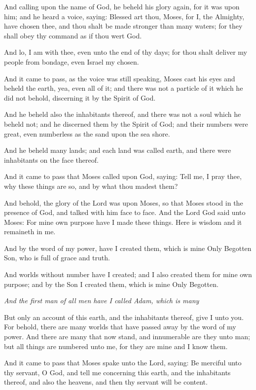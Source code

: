 And calling upon the name of God, he beheld his glory again, for it was upon him; and he
heard a voice, saying: Blessed art thou, Moses, for I, the Almighty, have chosen thee, and
thou shalt be made stronger than many waters; for they shall obey thy command as if thou
wert God.

And lo, I am with thee, even unto the end of thy days; for thou shalt deliver my people from
bondage, even Israel my chosen.

And it came to pass, as the voice was still speaking, Moses cast his eyes and beheld the earth,
yea, even all of it; and there was not a particle of it which he did not behold, discerning it by
the Spirit of God.

And he beheld also the inhabitants thereof, and there was not a soul which he beheld not; and
he discerned them by the Spirit of God; and their numbers were great, even numberless as the
sand upon the sea shore.

And he beheld many lands; and each land was called earth, and there were inhabitants on the
face thereof.

And it came to pass that Moses called upon God, saying: Tell me, I pray thee, why these
things are so, and by what thou madest them?

And behold, the glory of the Lord was upon Moses, so that Moses stood in the presence of
God, and talked with him face to face. And the Lord God said unto Moses: For mine own
purpose have I made these things. Here is wisdom and it remaineth in me.

And by the word of my power, have I created them, which is mine Only Begotten Son, who
is full of grace and truth.

And worlds without number have I created; and I also created them for mine own purpose;
and by the Son I created them, which is mine Only Begotten.

\textit{And the first man of all men have I called Adam, which is many}

But only an account of this earth, and the inhabitants thereof, give I unto you. For behold,
there are many worlds that have passed away by the word of my power. And there are many
that now stand, and innumerable are they unto man; but all things are numbered unto me, for
they are mine and I know them.

And it came to pass that Moses spake unto the Lord, saying: Be merciful unto thy servant, O
God, and tell me concerning this earth, and the inhabitants thereof, and also the heavens, and
then thy servant will be content.

